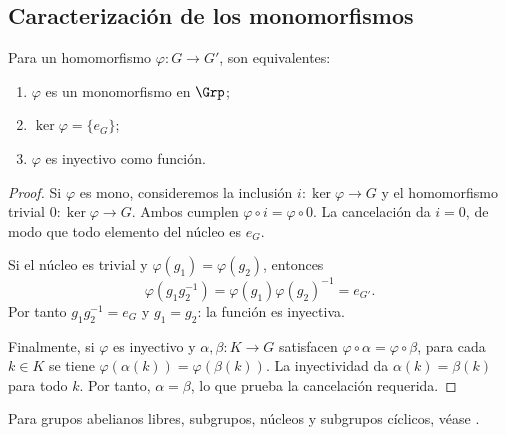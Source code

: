 \subsection{Caracterización de los monomorfismos}
\begin{prop}\label{prop:C4-mono}
Para un homomorfismo $\varphi:G\to G'$, son equivalentes:
\begin{enumerate}[label=\textup{(\alph*)}]
\item $\varphi$ es un monomorfismo en $\Grp$;
\item $\ker\varphi=\{e_G\}$;
\item $\varphi$ es inyectivo como función.
\end{enumerate}
\end{prop}
\begin{proof}
Si $\varphi$ es mono, consideremos la inclusión $i:\ker\varphi\to G$ y el homomorfismo trivial $0:\ker\varphi\to G$. Ambos cumplen $\varphi\circ i=\varphi\circ0$. La cancelación da $i=0$, de modo que todo elemento del núcleo es $e_G$.

Si el núcleo es trivial y $\varphi(g_1)=\varphi(g_2)$, entonces
\[
\varphi(g_1g_2^{-1})=\varphi(g_1)\varphi(g_2)^{-1}=e_{G'}.
\]
Por tanto $g_1g_2^{-1}=e_G$ y $g_1=g_2$: la función es inyectiva.

Finalmente, si $\varphi$ es inyectivo y $\alpha,\beta:K\to G$ satisfacen $\varphi\circ\alpha=\varphi\circ\beta$, para cada $k\in K$ se tiene $\varphi(\alpha(k))=\varphi(\beta(k))$. La inyectividad da $\alpha(k)=\beta(k)$ para todo $k$. Por tanto, $\alpha=\beta$, lo que prueba la cancelación requerida.
\end{proof}

\begin{obs}
Para grupos abelianos libres, subgrupos, núcleos y subgrupos cíclicos, véase \citet[cap.~II, 6.1--4, 6.6, 6.9 y 6.11]{aluffi2009}.
\end{obs}
